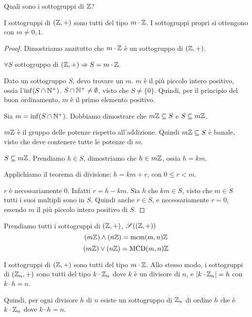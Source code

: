 Quali sono i sottogruppi di $\mathbb{Z}$?
\begin{prop}
I sottogruppi di $(\mathbb{Z}, +)$ sono tutti del tipo $m \cdot \mathbb{Z}$. I sottogruppi propri si ottengono con $m \neq 0, 1$.
\end{prop}
\begin{proof}
Dimostriamo anzitutto che $m \cdot \mathbb{Z}$ \`e un sottogruppo di $(\mathbb{Z}, +)$.

$\forall S$ sottogruppo di $(\mathbb{Z}, +) \Rightarrow S = m \cdot \mathbb{Z}$.

Dato un sottogruppo $S$, devo trovare un $m$. $m$ \`e il pi\`u piccolo intero positivo, ossia  l'$\inf (S \cap \mathbb{N}^+)$. $S \cap \mathbb{N}^+ \neq \emptyset$, visto che $S \neq \{ 0 \}$. Quindi, per il principio del buon ordinamento, $m$ \`e il primo elemento positivo.

Sia $m = \inf (S \cap \mathbb{N}^+)$. Dobbiamo dimostrare che $m \mathbb{Z} \subseteq S$ e $S \subseteq m \mathbb{Z}$.

$m \mathbb{Z}$ \`e il gruppo delle potenze rispetto all'addizione. Quindi $m \mathbb{Z} \subseteq S$ \`e banale, visto che deve contenere tutte le potenze di $m$.

$S \subseteq m \mathbb{Z}$. Prendiamo $h \in S$, dimostriamo che $h \in m \mathbb{Z}$, ossia $h = k m$.

Applichiamo il teorema di divisione: $h = k m + r$, con $0 \le r < m$.

$r$ \`e necessariamente 0. Infatti $r = h - km$. Sia $h$ che $k m \in S$, visto che $m \in S$ tutti i suoi multipli sono in $S$. Quindi anche $r \in S$, e necessariamente $r = 0$, essendo $m$ il pi\`u piccolo intero positivo di $S$.
\end{proof}
Prendiamo tutti i sottogruppi di $(\mathbb{Z}, +)$, $\mathscr{S}((\mathbb{Z}, +))$
\[
(m \mathbb{Z}) \wedge (n \mathbb{Z}) = \operatorname{mcm}(m, n) \mathbb{Z}
\]
\[
(m \mathbb{Z}) \vee (n \mathbb{Z}) = \operatorname{MCD}(m, n) \mathbb{Z}
\]

I sottogruppi di $(\mathbb{Z}, +)$ sono tutti del tipo $m \cdot \mathbb{Z}$. Allo stesso modo, i sottogruppi di $(\mathbb{Z}_n, +)$ sono tutti del tipo $k \cdot \mathbb{Z}_n$ dove $k$ \`e un divisore di $n$, e $\left\lvert{k \cdot \mathbb{Z}_n}\right\rvert = h$ con $k \cdot h = n$.

Quindi, per ogni divisore $h$ di $n$ esiste un sottogruppo di $\mathbb{Z}_n$ di ordine $h$ che \`e $k \cdot \mathbb{Z}_n$ dove $k \cdot h = n$.

